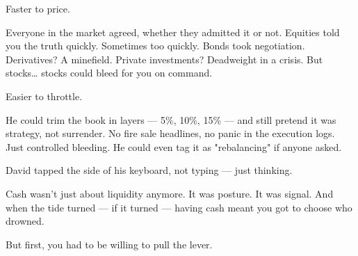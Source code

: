 Faster to price.

Everyone in the market agreed, whether they admitted it or not. Equities told you the truth quickly. Sometimes too quickly. Bonds took negotiation. Derivatives? A minefield. Private investments? Deadweight in a crisis. But stocks… stocks could bleed for you on command.

Easier to throttle.

He could trim the book in layers — 5\%, 10\%, 15\% — and still pretend it was strategy, not surrender. No fire sale headlines, no panic in the execution logs. Just controlled bleeding. He could even tag it as "rebalancing" if anyone asked.

David tapped the side of his keyboard, not typing — just thinking.

Cash wasn’t just about liquidity anymore. It was posture. It was signal. And when the tide turned — if it turned — having cash meant you got to choose who drowned.

But first, you had to be willing to pull the lever.

\medskip

